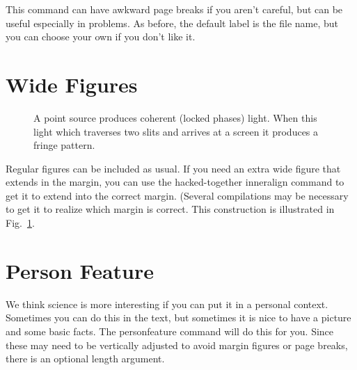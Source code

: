 \documentclass{BYUTextbook}
\begin{document}

This command can have awkward page breaks if you aren't careful,
but can be useful especially in problems.  As before, the default
label is the file name, but you can choose your own if you don't
like it.

\section{Wide Figures}

\begin{figure}[b]
    \caption{\label{fig:8.6} A point source produces coherent
    (locked phases) light.  When this light which traverses two
   slits and arrives at a screen it produces a fringe pattern.
    }
\end{figure}


Regular figures can be included as usual.  If you need an extra
wide figure that extends in the margin, you can use the
hacked-together inneralign command to get it to extend into the
correct margin.  (Several compilations may be necessary to get it
to realize which margin is correct.  This construction is
illustrated in Fig.~\ref{fig:8.6}.



\section{Person Feature}

We think science is more interesting if you can put it in a
personal context.  Sometimes you can do this in the text, but
sometimes it is nice to have a picture and some basic facts.  The
personfeature command will do this for you.  Since these may need
to be vertically adjusted to avoid margin figures or page breaks,
there is an optional length argument.

\end{document}
